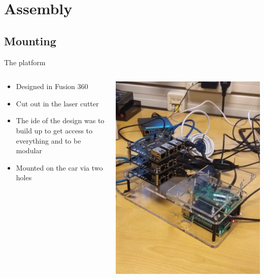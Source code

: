 \documentclass{beamer}
\begin{document}
\section{Assembly}
\subsection{Mounting}
\begin{frame}{The platform}
    
    \begin{columns}
        \begin{column}{0.47\textwidth}
            \begin{itemize}
                \item  Designed in Fusion 360
                \item  Cut out in the laser cutter
                \item  The ide of the design was to build up to get access to everything and to be modular
                \item Mounted on the car via two holes 
            \end{itemize}
        \end{column}
        \begin{column}{0.5\textwidth}
            \includegraphics[width=0.7\linewidth]{platform.jpg}
            \label{fig:platform}
        \end{column}
    \end{columns}
\end{frame}
\end{document}
